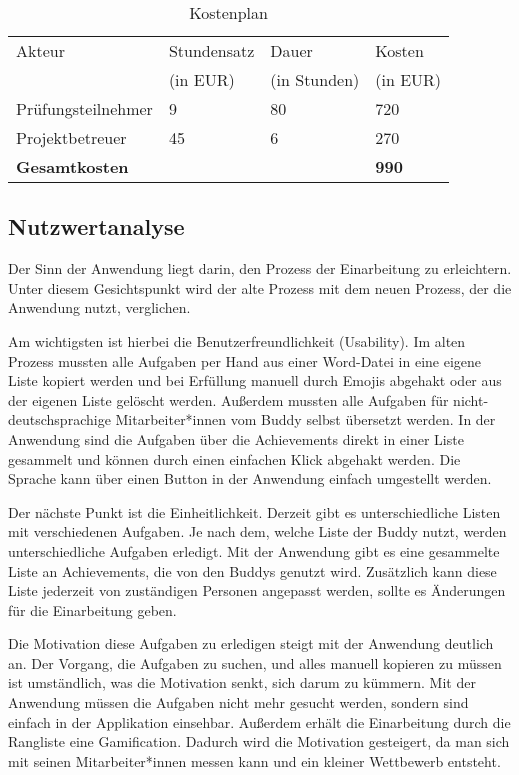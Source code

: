 \documentclass[12pt]{article}
\begin{document}
\begin{table}[H]
    \centering
    \begin{tabular}{|l|l|l|l|}
        \hline
        Akteur & Stundensatz & Dauer & Kosten \\
        & (in EUR) & (in Stunden) & (in EUR) \\
        \hline
        Prüfungsteilnehmer & 9 & 80 & 720 \\
        Projektbetreuer & 45 & 6 & 270 \\
        \hline
        \textbf{Gesamtkosten} &&& \textbf{990} \\
        \hline
        
    \end{tabular}
    \caption{Kostenplan}
    \label{table:costs}
\end{table}


\subsection{Nutzwertanalyse}

Der Sinn der Anwendung liegt darin, den Prozess der Einarbeitung zu erleichtern. Unter diesem Gesichtspunkt wird der alte Prozess
mit dem neuen Prozess, der die Anwendung nutzt, verglichen.

Am wichtigsten ist hierbei die Benutzerfreundlichkeit (Usability). Im alten Prozess mussten alle Aufgaben per Hand aus einer Word-Datei in eine eigene
Liste kopiert werden und bei Erfüllung manuell durch Emojis abgehakt oder aus der eigenen Liste gelöscht werden. 
Außerdem mussten alle Aufgaben für nicht-deutschsprachige Mitarbeiter*innen vom Buddy selbst übersetzt werden.\newline
In der Anwendung sind die Aufgaben über die Achievements direkt in einer Liste gesammelt und können durch einen einfachen Klick abgehakt werden.
Die Sprache kann über einen Button in der Anwendung einfach umgestellt werden.

Der nächste Punkt ist die Einheitlichkeit. Derzeit gibt es unterschiedliche Listen mit verschiedenen Aufgaben. Je nach dem, welche Liste der
Buddy nutzt, werden unterschiedliche Aufgaben erledigt. \newline
Mit der Anwendung gibt es eine gesammelte Liste an Achievements, die von den Buddys genutzt wird. Zusätzlich kann diese Liste jederzeit von 
zuständigen Personen angepasst werden, sollte es Änderungen für die Einarbeitung geben.

Die Motivation diese Aufgaben zu erledigen steigt mit der Anwendung deutlich an. Der Vorgang, die Aufgaben zu suchen, und alles manuell kopieren
zu müssen ist umständlich, was die Motivation senkt, sich darum zu kümmern. Mit der Anwendung müssen die Aufgaben nicht mehr gesucht werden, sondern
sind einfach in der Applikation einsehbar. Außerdem erhält die Einarbeitung durch die Rangliste eine Gamification. Dadurch wird die Motivation gesteigert, 
da man sich mit seinen Mitarbeiter*innen messen kann und ein kleiner Wettbewerb entsteht.
\end{document}
